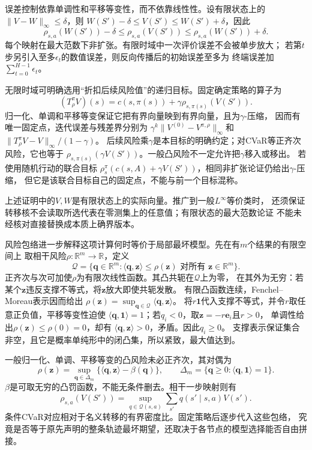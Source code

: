 误差控制依靠单调性和平移等变性，而不依靠线性性。设有限状态上的
$\lVert V-W\rVert_\infty\leq\delta$，则
$W(S')-\delta\leq V(S')\leq W(S')+\delta$，因此
\[
  \rho_{s,a}(W(S'))-\delta
  \leq\rho_{s,a}(V(S'))
  \leq\rho_{s,a}(W(S'))+\delta.
\]
每个映射在最大范数下非扩张。有限时域中一次评价误差不会被单步放大；
若第$t$步另引入至多$\epsilon_t$的数值误差，则反向传播后的初始误差至多为
终端误差加$\sum_{t=0}^{H-1}\epsilon_t$。

无限时域可明确选用“折扣后续风险值”的递归目标。固定确定策略的算子为
\[
  (T^\pi_\rho V)(s)
  =c(s,\pi(s))+\gamma\rho_{s,\pi(s)}(V(S')).
\]
归一化、单调和平移等变保证它把有界向量映到有界向量，且为$\gamma$-压缩，
因而有唯一固定点，迭代误差与残差界分别为
$\gamma^k\lVert V^{(0)}-V^{\pi,\rho}\rVert_\infty$和
$\lVert T^\pi_\rho V-V\rVert_\infty/(1-\gamma)$。
后续风险乘$\gamma$是本目标的明确约定；对CVaR等正齐次风险，它也等于
$\rho_{s,\pi(s)}(\gamma V(S'))$。一般凸风险不一定允许把$\gamma$移入或移出。
若使用随机行动的联合目标
$\rho^\pi_s(c(s,A)+\gamma V(S'))$，相同非扩张论证仍给出$\gamma$-压缩，
但它是该联合目标自己的固定点，不能与前一个目标混称。

上述证明中的$V,W$是有限状态上的实际向量。推广到一般$L^\infty$等价类时，
还须保证转移核不会读取所选代表在零测集上的任意值；有限状态的最大范数论证
不能未经核对直接替换成本质上确界版本。

风险包络进一步解释这项计算何时等价于局部最坏模型。先在有$m$个结果的有限空间上
取相干风险$\rho:\mathbb R^m\to\mathbb R$，定义
\[
  \mathcal Q=\{\bm q\in\mathbb R^m:
    \langle\bm q,\bm z\rangle\leq\rho(\bm z)
    \text{ 对所有 }\bm z\in\mathbb R^m\}.
\]
正齐次与次可加使$\rho$为有限次线性函数。其凸共轭在$\mathcal Q$上为零，
在其外为无穷：若某个$\bm z$违反支撑不等式，将$\bm z$放大即使共轭发散。
有限凸函数连续，Fenchel--Moreau表示因而给出
$\rho(\bm z)=\sup_{\bm q\in\mathcal Q}\langle\bm q,\bm z\rangle$。
将$r\bm 1$代入支撑不等式，并令$r$取任意正负值，平移等变性迫使
$\langle\bm q,\bm1\rangle=1$；若$q_i<0$，取$\bm z=-r\bm e_i$且$r>0$，
单调性给出$\rho(\bm z)\leq\rho(0)=0$，却有
$\langle\bm q,\bm z\rangle>0$，矛盾。因此$q_i\geq0$。
支撑表示保证集合非空，且它是概率单纯形中的闭凸集，所以紧致，最大值达到。

一般归一化、单调、平移等变的凸风险未必正齐次，其对偶为
\[
  \rho(\bm z)=\sup_{\bm q\in\Delta_m}
  \{\langle\bm q,\bm z\rangle-\beta(\bm q)\},\qquad
  \Delta_m=\{\bm q\geq0:\langle\bm q,\bm1\rangle=1\}.
\]
$\beta$是可取无穷的凸罚函数，不能无条件删去。相干一步映射则有
\begin{equation}
  \rho_{s,a}(V(S'))
  =\sup_{q\in\mathcal Q(s,a)}
    \sum_{s'}q(s'\mid s,a)V(s').
  \label{eq:decision-one-step-risk-envelope}
\end{equation}
条件CVaR对应相对于名义转移的有界密度比。固定策略后逐步代入这些包络，
究竟是否等于原先声明的整条轨迹最坏期望，还取决于各节点的模型选择能否自由拼接。

